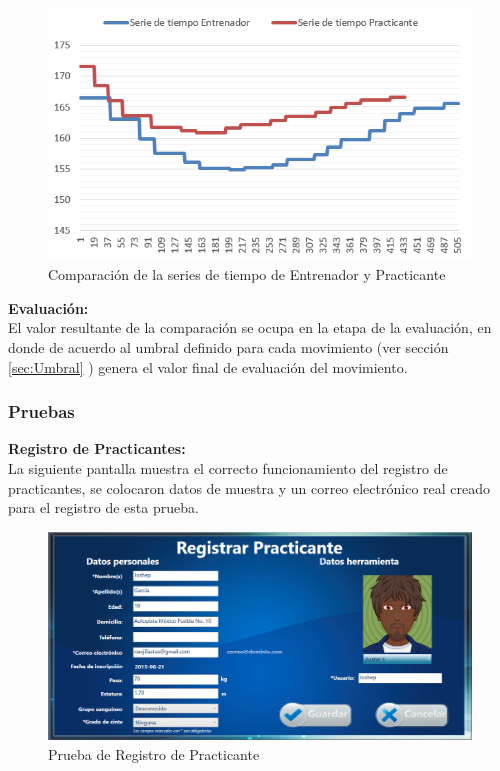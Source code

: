 \begin{figure}[H]%
	\begin{center}
		\includegraphics[scale=.45]{./Figuras/Implementacion/GraficaComparacionDTW}
	\end{center}
	\caption{Comparación de la series de tiempo de Entrenador y Practicante}
	\label{fig:GraficaComparacionDTW}
\end{figure}

\textbf{Evaluación:}\\
El valor resultante de la comparación se ocupa en la etapa de la evaluación, en donde de acuerdo al umbral definido para cada movimiento (ver sección \ref{sec:Umbral} ) genera el valor final de evaluación del movimiento.\\

\clearpage

\subsubsection{Pruebas}

\textbf{Registro de Practicantes:}\\
La siguiente pantalla muestra el correcto funcionamiento del registro de practicantes, se colocaron datos de muestra y un correo electrónico real creado para el registro de esta prueba.
\begin{figure}[H]%
	\begin{center}
		\includegraphics[scale=0.50]{./Figuras/Implementacion/Pruebas/Prueba_Registro_practicante}
	\end{center}
	\caption{Prueba de Registro de Practicante}
	\label{fig:Prueba_Registro_practicante}
\end{figure}


